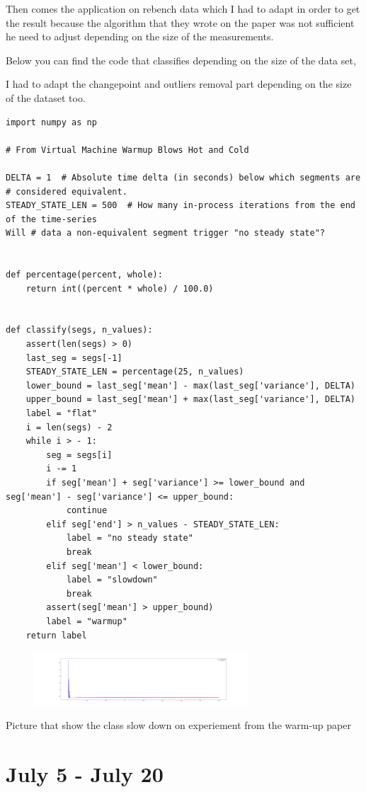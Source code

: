\documentclass[12pt,a4paper]{article}
\begin{document}
Then comes the application on rebench data which I had to adapt in order to get the result because the algorithm that they wrote on the paper was not sufficient he need to adjust depending on the size of the measurements.

Below you can find the code that classifies depending on the size of the data set,

I had to adapt the changepoint and outliers removal part depending on the size of the dataset too.

\begin{lstlisting}
import numpy as np

# From Virtual Machine Warmup Blows Hot and Cold

DELTA = 1  # Absolute time delta (in seconds) below which segments are
# considered equivalent.
STEADY_STATE_LEN = 500  # How many in-process iterations from the end of the time-series
Will # data a non-equivalent segment trigger "no steady state"?


def percentage(percent, whole):
    return int((percent * whole) / 100.0)


def classify(segs, n_values):
    assert(len(segs) > 0)
    last_seg = segs[-1]
    STEADY_STATE_LEN = percentage(25, n_values)
    lower_bound = last_seg['mean'] - max(last_seg['variance'], DELTA)
    upper_bound = last_seg['mean'] + max(last_seg['variance'], DELTA)
    label = "flat"
    i = len(segs) - 2
    while i > - 1:
        seg = segs[i]
        i -= 1
        if seg['mean'] + seg['variance'] >= lower_bound and seg['mean'] - seg['variance'] <= upper_bound:
            continue
        elif seg['end'] > n_values - STEADY_STATE_LEN:
            label = "no steady state"
            break
        elif seg['mean'] < lower_bound:
            label = "slowdown"
            break
        assert(seg['mean'] > upper_bound)
        label = "warmup"
    return label
\end{lstlisting}


\begin{figure}[h]
\includegraphics[width=8cm]{assets/plot_11_slowdown.png}
\end{figure}

Picture that show the class slow down on experiement from the warm-up paper

\section{July 5 - July 20}
\end{document}
